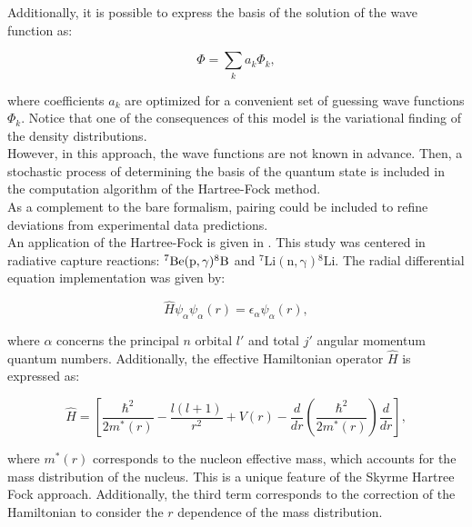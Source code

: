 \documentclass[openany]{book}
\begin{document}
Additionally, it is possible to express the basis of the solution of the wave function as: 

\begin{equation} \label{eq:micro_hartreeFock_basis}
	\Phi = \sum_{k} a_k \Phi_k,
\end{equation}

where coefficients $a_k$ are optimized for a convenient set of guessing wave functions $\Phi_k$. Notice that one of the consequences of this model is the variational finding of the density distributions.   \\


However, in this approach, the wave functions are not known in advance. Then, a stochastic process of determining the basis of the quantum state is included in the computation algorithm of the Hartree-Fock method. \\

As a complement to the bare formalism, pairing could be included to refine deviations from experimental data predictions. \\

An application of the Hartree-Fock is given in \cite{leanh_minhloc_2022}. This study was centered in radiative capture reactions: $\mathrm{{}^{7}Be(p, \gamma){}^{8}B}$ and $\mathrm{{}^{7}Li(n, \gamma){}^{8}Li}$. The radial differential equation implementation was given by: 

\begin{equation}\label{eq:micro_hartreeFock_implementation_schrodinger}
	\hat H \psi_{\alpha} \psi_{\alpha}(r) = \epsilon_\alpha \psi_{\alpha} (r), 
\end{equation}

where $\alpha$ concerns the principal $n$ orbital $l'$ and total $j'$ angular momentum quantum numbers. Additionally, the effective Hamiltonian operator $\hat H$ is expressed as: 

\begin{equation}\label{eq:micro_hartreeFock_implementation_hamiltonian}
	\hat H =  \left[\frac{\hbar^2}{2m^{*}(r)} - \frac{l(l+1)}{r^2}  + V(r) - \frac{d}{dr} \left (\frac{\hbar^2}{2m^*(r)} \right) \frac{d}{dr} \right] , 
\end{equation}

where $m^{*}(r)$ corresponds to the nucleon effective mass, which accounts for the mass distribution of the nucleus. This is a unique feature of the Skyrme Hartree Fock approach.  Additionally, the third term corresponds to the correction of the Hamiltonian to consider the $r$ dependence of the mass distribution. \\
\end{document}
